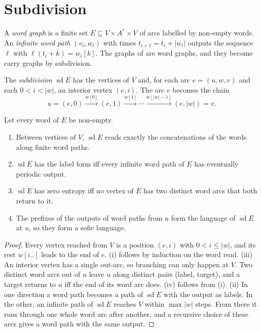 \section{Subdivision}\label{sec:subdivision}

A \emph{word graph} is a finite set \(E\subseteq V\times A^*\times V\) of arcs labelled by
non-empty words. An \emph{infinite word path} \((v_i,w_i)\) with times \(t_{i+1}=t_i+|w_i|\)
outputs the sequence \(\ell\) with \(\ell(t_i+k)=w_i[k]\). The graphs of \cite{Oda26} are word
graphs, and they become carry graphs by subdivision.

\begin{definition}\label{def:subdivide}
The \emph{subdivision} \(\operatorname{sd}E\) has the vertices of \(V\) and, for each arc
\(e=(u,w,v)\) and each \(0<i<|w|\), an interior vertex \((e,i)\). The arc \(e\) becomes the chain
\[
u=(e,0)\xrightarrow{w[0]}(e,1)\xrightarrow{w[1]}\cdots\xrightarrow{w[|w|-1]}(e,|w|)=v .
\]
\end{definition}

\begin{theorem}[subdivision]\label{thm:subdivide}
Let every word of \(E\) be non-empty.
\begin{enumerate}[label=(\roman*)]
\item Between vertices of \(V\), \(\operatorname{sd}E\) reads exactly the concatenations of the
  words along finite word paths.
\item \(\operatorname{sd}E\) has the label form iff every infinite word path of \(E\) has
  eventually periodic output.
\item \(\operatorname{sd}E\) has zero entropy iff no vertex of \(E\) has two distinct word arcs
  that both return to it.
\item The prefixes of the outputs of word paths from \(u\) form the language of
  \(\operatorname{sd}E\) at \(u\), so they form a sofic language.
\end{enumerate}
\end{theorem}

\begin{proof}
Every vertex reached from \(V\) is a position \((e,i)\) with \(0<i\le|w|\), and its rest
\(w[i..]\) leads to the end of \(e\). (i) follows by induction on the word read. (iii) An
interior vertex has a single out-arc, so branching can only happen at \(V\). Two distinct word
arcs out of \(u\) leave \(u\) along distinct pairs (label, target), and a target returns to \(u\)
iff the end of its word arc does. (iv) follows from (i). (ii) In one direction a word path
becomes a path of \(\operatorname{sd}E\) with the output as labels. In the other, an infinite
path of \(\operatorname{sd}E\) reaches \(V\) within \(\max|w|\) steps. From there it runs
through one whole word arc after another, and a recursive choice of these arcs gives a word
path with the same output.
\end{proof}

